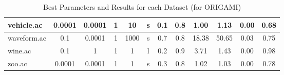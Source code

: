 \begin{table}[htbp]
\begin{tabular}{|l|c|c|c|c|c|c|c||c|c|c|c|}
		\hline
		vehicle.ac     & 0.0001   & 0.0001      & 1              & 10                  & s        & 0.1    & 0.8   & 1.00           & 1.13           & 0.00           & 0.68           \\
		\hline
		waveform.ac    & 0.1      & 0.0001      & 1              & 1000                & s        & 0.7    & 0.8   & 18.38          & 50.65          & 0.03           & 0.75           \\
		\hline
		wine.ac        & 0.1      & 1           & 1              & 1                   & l        & 0.2    & 0.9   & 3.71           & 1.43           & 0.00           & 0.98           \\
		\hline
		zoo.ac         & 0.0001   & 0.0001      & 1              & 1                   & s        & 0.3    & 0.8   & 1.02           & 1.03           & 0.00           & 0.78           \\
		\hline
		\end{tabular}
	\caption{Best Parameters and Results for each Dataset (for ORIGAMI)}
	\label{tab:best_runs_for_each_db_origami}
\end{table}